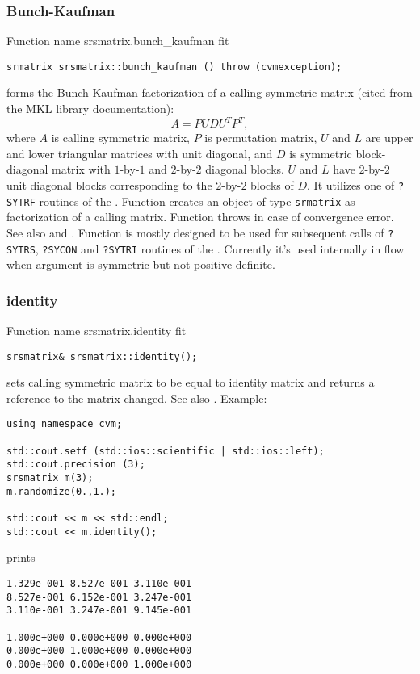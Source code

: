 \subsubsection{Bunch-Kaufman}
Function%
\pdfdest name {srsmatrix.bunch_kaufman} fit
\begin{verbatim}
srmatrix srsmatrix::bunch_kaufman () throw (cvmexception);
\end{verbatim}
forms the Bunch-Kaufman factorization of a calling symmetric matrix 
(cited from the MKL library documentation):
\begin{equation*}
A=PUDU^TP^T,
\end{equation*}
where $A$ is calling symmetric matrix,
$P$ is  permutation matrix, $U$ and $L$ are upper and lower triangular
matrices with unit diagonal, and $D$ is  symmetric 
block-diagonal matrix with $1$-by-$1$ and $2$-by-$2$
diagonal blocks. $U$ and $L$ have $2$-by-$2$ unit diagonal 
blocks corresponding to the $2$-by-$2$ blocks of $D$.
It utilizes one of \verb"?SYTRF" routines of the
.
Function
creates an object of type \verb"srmatrix" as 
 factorization of a calling matrix.
Function throws 
in case of convergence error.
See also
 and
.
Function is mostly designed to be used for subsequent calls
of \verb"?SYTRS", \verb"?SYCON" and \verb"?SYTRI" routines of the
.
Currently it's used internally in  flow
when argument is symmetric but not positive-definite.
\newpage





\subsubsection{identity}
Function%
\pdfdest name {srsmatrix.identity} fit
\begin{verbatim}
srsmatrix& srsmatrix::identity();
\end{verbatim}
sets  calling symmetric matrix to be equal to identity matrix
and returns a reference to
the matrix changed. 
See also .
Example:
\begin{Verbatim}
using namespace cvm;

std::cout.setf (std::ios::scientific | std::ios::left); 
std::cout.precision (3);
srsmatrix m(3);
m.randomize(0.,1.);

std::cout << m << std::endl;
std::cout << m.identity();
\end{Verbatim}
prints
\begin{Verbatim}
1.329e-001 8.527e-001 3.110e-001
8.527e-001 6.152e-001 3.247e-001
3.110e-001 3.247e-001 9.145e-001

1.000e+000 0.000e+000 0.000e+000
0.000e+000 1.000e+000 0.000e+000
0.000e+000 0.000e+000 1.000e+000
\end{Verbatim}
\newpage



